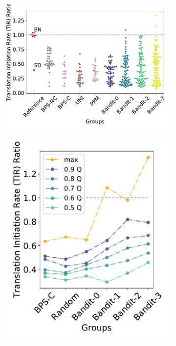 \documentclass{scrartcl}[2013/05/29]%
\begin{document}
\begin{figure}[!ht]
    \centering
    \begin{subfigure}[b]{0.48\textwidth}
        \centering
        \caption{}
        \includegraphics[scale=0.35]{plots/Main_Paper/swarmplot.pdf}
    \end{subfigure}
    \begin{subfigure}[b]{0.25\textwidth}
        \centering
        \caption{}
        \includegraphics[scale=0.35]{plots/Main_Paper/quantplot.pdf}

\end{subfigure}
\end{figure}
\end{document}
